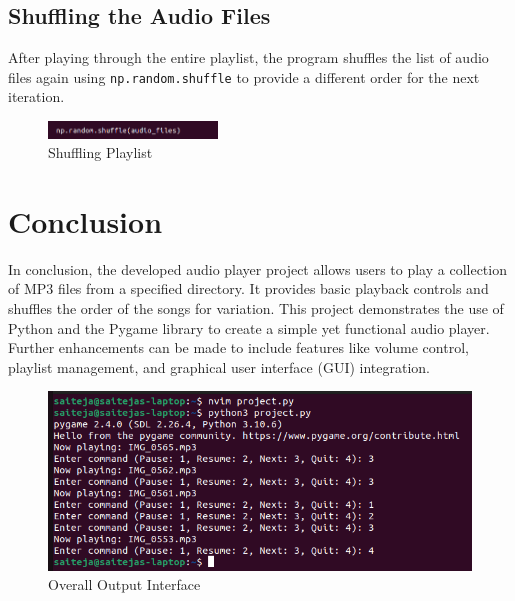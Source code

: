 \documentclass[journal,12pt,twocolumn]{IEEEtran}
\begin{document}
\subsection{Shuffling the Audio Files}
After playing through the entire playlist, the program shuffles the list of audio files again using \texttt{np.random.shuffle} to provide a different order for the next iteration.
\begin{figure}[h]
    \centering
    \includegraphics[width = 0.4\textwidth]{figs/fig4.png}
    \caption{Shuffling Playlist}
    \label{fig:my_label}
\end{figure}
\section{Conclusion}
In conclusion, the developed audio player project allows users to play a collection of MP3 files from a specified directory. It provides basic playback controls and shuffles the order of the songs for variation. This project demonstrates the use of Python and the Pygame library to create a simple yet functional audio player. Further enhancements can be made to include features like volume control, playlist management, and graphical user interface (GUI) integration.
\begin{figure}[h]
    \centering
    \includegraphics[width = 1\textwidth]{figs/fig5.png}
    \caption{Overall Output Interface}
    \label{fig:my_label}
\end{figure}
\end{document}
